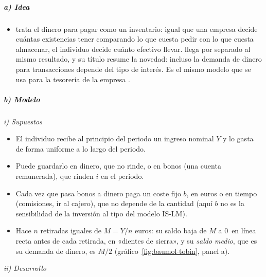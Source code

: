 \documentclass[11pt]{article}
\begin{document}
\subparagraph{a) Idea}

\begin{itemize}
\item \textcite{Baumol1952Transactions} trata el dinero para pagar como un inventario: igual que una empresa decide cuántas existencias tener comparando lo que cuesta pedir con lo que cuesta almacenar, el individuo decide cuánto efectivo llevar. \textcite{Tobin1956Interest} llega por separado al mismo resultado, y su título resume la novedad: incluso la demanda de dinero para transacciones depende del tipo de interés. Es el mismo modelo que se usa para la tesorería de la empresa .
\end{itemize}

\subparagraph{b) Modelo}

\hspace*{3.6em}\emph{i) Supuestos}

\begin{itemize}
\item El individuo recibe al principio del periodo un ingreso nominal $Y$ y lo gasta de forma uniforme a lo largo del periodo.
\item Puede guardarlo en dinero, que no rinde, o en bonos (una cuenta remunerada), que rinden $i$ en el periodo.
\item Cada vez que pasa bonos a dinero paga un coste fijo $b$, en euros o en tiempo (comisiones, ir al cajero), que no depende de la cantidad (aquí $b$ no es la sensibilidad de la inversión al tipo del modelo IS-LM).
\item Hace $n$ retiradas iguales de $M=Y/n$ euros: su saldo baja de $M$ a 0~en línea recta antes de cada retirada, en «dientes de sierra», y su \emph{saldo medio}, que es su demanda de dinero, es $M/2$ (gráfico~\ref{fig:baumol-tobin}, panel a).
\end{itemize}

\hspace*{3.6em}\emph{ii) Desarrollo}
\end{document}
